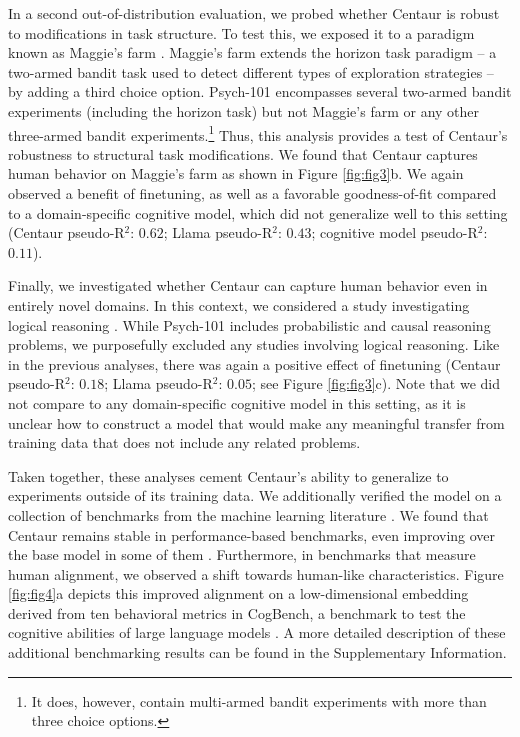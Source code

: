 \documentclass[pdflatex,sn-nature]{sn-jnl}%
\theoremstyle{thmstyleone}%
\theoremstyle{thmstyletwo}%
\theoremstyle{thmstylethree}%
\begin{document}
In a second out-of-distribution evaluation, we probed whether Centaur is robust to modifications in task structure. To test this, we exposed it to a paradigm known as Maggie's farm \cite{dubois2022value}. Maggie's farm extends the horizon task paradigm -- a two-armed bandit task used to detect different types of exploration strategies \cite{wilson2014humans} -- by adding a third choice option. Psych-101 encompasses several two-armed bandit experiments (including the horizon task) but not Maggie's farm or any other three-armed bandit experiments.\footnote{It does, however, contain multi-armed bandit experiments with more than three choice options.} Thus, this analysis provides a test of Centaur's robustness to structural task modifications. We found that Centaur captures human behavior on Maggie's farm as shown in Figure \ref{fig:fig3}b. We again observed a benefit of finetuning, as well as a favorable goodness-of-fit compared to a domain-specific cognitive model, which did not generalize well to this setting (Centaur pseudo-R$^2$: $0.62$; Llama pseudo-R$^2$: $0.43$; cognitive model pseudo-R$^2$: $0.11$). 

Finally, we investigated whether Centaur can capture human behavior even in entirely novel domains. In this context, we considered a study investigating logical reasoning \cite{jansen2021rational}. While Psych-101 includes probabilistic and causal reasoning problems, we purposefully excluded any studies involving logical reasoning. Like in the previous analyses, there was again a positive effect of finetuning (Centaur pseudo-R$^2$: $0.18$; Llama pseudo-R$^2$: $0.05$; see Figure \ref{fig:fig3}c). Note that we did not compare to any domain-specific cognitive model in this setting, as it is unclear how to construct a model that would make any meaningful transfer from training data that does not include any related problems.

Taken together, these analyses cement Centaur’s ability to generalize to experiments outside of its training data. We additionally verified the model on a collection of benchmarks from the machine learning literature \cite{pmlr-v235-coda-forno24a, kipnis2024texttt}. We found that Centaur remains stable in performance-based benchmarks, even improving over the base model in some of them \cite{kipnis2024texttt}. Furthermore, in benchmarks that measure human alignment, we observed a shift towards human-like characteristics. Figure \ref{fig:fig4}a depicts this improved alignment on a low-dimensional embedding derived from ten behavioral metrics in CogBench, a benchmark to test the cognitive abilities of large language models \cite{pmlr-v235-coda-forno24a}. A more detailed description of these additional benchmarking results can be found in the Supplementary Information.
\end{document}
